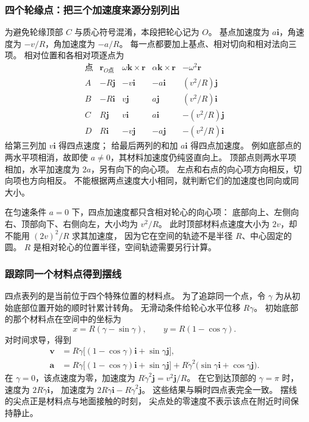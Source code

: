 \documentclass[UTF8,zihao=-4,fontset=fandol,a4paper]{ctexart}
\newcommand{\vect}[1]{\bm{#1}}
\begin{document}
\subsubsection*{四个轮缘点：把三个加速度来源分别列出}
为避免轮缘顶部 $C$ 与质心符号混淆，本段把轮心记为 $O$。
基点加速度为 $a\vect i$，角速度为 $-v/R$，角加速度为 $-a/R$。
每一点都要加上基点、相对切向和相对法向三项。
相对位置和各相对项逐点为
\[
\begin{array}{c|c|c|c|c}
\text{点}&\vect r_{O\text{点}}&\omega\vect k\times\vect r
&\alpha\vect k\times\vect r&-\omega^2\vect r\\ \hline
A&-R\vect j&-v\vect i&-a\vect i&(v^2/R)\vect j\\
B&-R\vect i&v\vect j&a\vect j&(v^2/R)\vect i\\
C&R\vect j&v\vect i&a\vect i&-(v^2/R)\vect j\\
D&R\vect i&-v\vect j&-a\vect j&-(v^2/R)\vect i
\end{array}
\]
给第三列加 $v\vect i$ 得四点速度；
给最后两列的和加 $a\vect i$ 得四点加速度。
例如底部点的两水平项相消，故即使 $a\ne0$，其材料加速度仍纯竖直向上。
顶部点则两水平项相加，水平加速度为 $2a$，另有向下的向心项。
左点和右点的向心项方向相反，切向项也方向相反。
不能根据两点速度大小相同，就判断它们的加速度也同向或同大小。

在匀速条件 $a=0$ 下，四点加速度都只含相对轮心的向心项：
底部向上、左侧向右、顶部向下、右侧向左，大小均为 $v^2/R$。
此时顶部材料点速度大小为 $2v$，却不能用 $(2v)^2/R$ 求其加速度，
因为它在空间的轨迹不是半径 $R$、中心固定的圆。
$R$ 是相对轮心的位置半径，空间轨迹需要另行计算。

\subsubsection*{跟踪同一个材料点得到摆线}
四点表列的是当前位于四个特殊位置的材料点。
为了追踪同一个点，令 $\gamma$ 为从初始底部位置开始的顺时针累计转角。
无滑动条件给轮心水平位移 $R\gamma$。
初始底部的那个材料点在空间中的坐标为
\[
x=R(\gamma-\sin\gamma),\qquad
 y=R(1-\cos\gamma).
\]
对时间求导，得到
\begin{align*}
\vect v&=R\dot\gamma
\bigl[(1-\cos\gamma)\vect i+\sin\gamma\vect j\bigr],\\
\vect a&=R\ddot\gamma
\bigl[(1-\cos\gamma)\vect i+\sin\gamma\vect j\bigr]
+R\dot\gamma^2
\bigl(\sin\gamma\vect i+\cos\gamma\vect j\bigr).
\end{align*}
在 $\gamma=0$，该点速度为零，加速度为
$R\dot\gamma^2\vect j=v^2\vect j/R$。
在它到达顶部的 $\gamma=\pi$ 时，速度为 $2R\dot\gamma\vect i$，
加速度为 $2R\ddot\gamma\vect i-R\dot\gamma^2\vect j$。
这些结果与瞬时四点表完全一致。
摆线的尖点正是材料点与地面接触的时刻，
尖点处的零速度不表示该点在附近时间保持静止。
\end{document}
